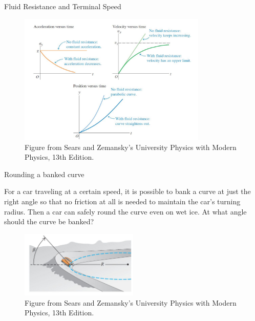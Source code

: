 \documentclass[]{beamer}
\begin{document}
  






 \begin{frame}
  Fluid Resistance and Terminal Speed
 \vspace{3mm}




  \begin{figure}[h!]  
    \includegraphics[width=0.8\textwidth]{images/f25.jpg}
    \caption{ {\tiny Figure from Sears and Zemansky's University Physics 
    with Modern Physics, 13th Edition.} }
  \end{figure}



   \end{frame}








   \begin{frame}
    Rounding a banked curve
   \vspace{3mm}
  
   For a car traveling at a certain speed, it is possible to bank a curve at
   just the right angle so that no friction at all is needed to maintain the
   car’s turning radius. Then a car can safely round the curve even on
   wet ice. At what angle should the curve be banked?
  
  
    \begin{figure}[h!]  
      \includegraphics[width=0.5\textwidth]{images/f27.jpg}
      \caption{ {\tiny Figure from Sears and Zemansky's University Physics 
      with Modern Physics, 13th Edition.} }
    \end{figure}
  
  
  
     \end{frame}
\end{document}
